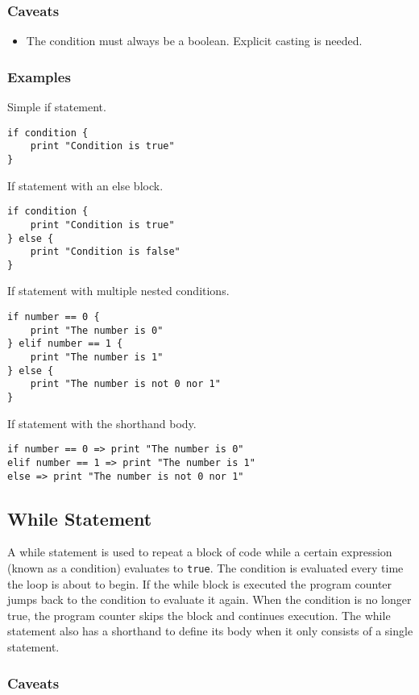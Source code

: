 \subsubsection{Caveats}

\begin{itemize}
    \item The condition must always be a boolean. Explicit casting is needed.
\end{itemize}

\subsubsection{Examples}

Simple if statement.
\begin{lstlisting}
if condition {
    print "Condition is true"
}
\end{lstlisting}
If statement with an else block.
\begin{lstlisting}
if condition {
    print "Condition is true"
} else {
    print "Condition is false"
}
\end{lstlisting}
If statement with multiple nested conditions.
\begin{lstlisting}
if number == 0 {
    print "The number is 0"
} elif number == 1 {
    print "The number is 1"
} else {
    print "The number is not 0 nor 1"
}
\end{lstlisting}
If statement with the shorthand body.
\begin{lstlisting}
if number == 0 => print "The number is 0"
elif number == 1 => print "The number is 1"
else => print "The number is not 0 nor 1"
\end{lstlisting}

\subsection{While Statement}

A while statement is used to repeat a block of code while a certain expression (known as a condition) evaluates to \texttt{true}.
The condition is evaluated every time the loop is about to begin. If the while block is executed the program counter jumps back
to the condition to evaluate it again. When the condition is no longer true, the program counter skips the block and continues execution.
The while statement also has a shorthand to define its body when it only consists of a single statement.

\subsubsection{Caveats}

